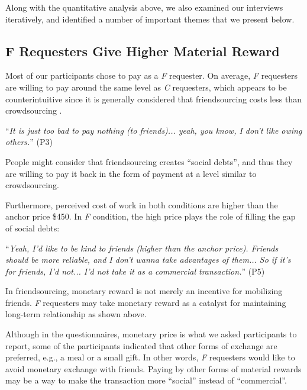 Along with the quantitative analysis above, we also examined our interviews iteratively, 
and identified a number of important themes that we present below.

\subsection{F Requesters Give Higher Material Reward}
Most of our participants chose to pay as a \emph{F} requester.
On average, \emph{F} requesters are willing to pay around the same level as \emph{C} requesters, 
which appears to be counterintuitive since it is generally considered that 
friendsourcing costs less than crowdsourcing \cite{Rzeszotarski:CHI14:SocialCost}. 

``\emph{It is just too bad to pay nothing (to friends)... yeah, you know, I don't like owing others.}'' (P3)

People might consider that friendsourcing creates ``social debts'', 
and thus they are willing to pay it back in the form of payment at a level similar to crowdsourcing.

Furthermore, perceived cost of work in both conditions are higher than the anchor price \$450. 
In \emph{F} condition, the high price plays the role of filling the gap of social debts:

``\emph{Yeah, I'd like to be kind to friends (higher than the anchor price). 
Friends should be more reliable, and I don't wanna take advantages of them... 
So if it's for friends, I'd not... I'd not take it as a commercial transaction.}'' (P5)

In friendsourcing, monetary reward is not merely an incentive for mobilizing friends. 
\emph{F} requesters may take monetary reward as a catalyst for maintaining long-term relationship as shown above.

Although in the questionnaires, monetary price is what we asked participants to report, 
some of the participants indicated that other forms of exchange are preferred, e.g., a meal or a small gift.
In other words, \emph{F} requesters would like to avoid monetary exchange with friends. 
Paying by other forms of material rewards may be a way to make the transaction more ``social'' instead of ``commercial''.



